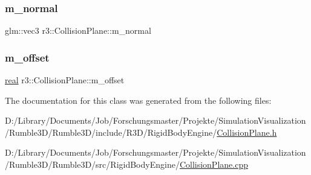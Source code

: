 \mbox{\label{classr3_1_1_collision_plane_ab65e832434d2da433e79c93ac12f4b43}} 
\subsubsection{\texorpdfstring{m\+\_\+normal}{m\_normal}}
{\footnotesize\ttfamily glm\+::vec3 r3\+::\+Collision\+Plane\+::m\+\_\+normal\hspace{0.3cm}{\ttfamily [protected]}}

\mbox{\label{classr3_1_1_collision_plane_a8ae3c28197b05088e405ff9944632f74}} 
\subsubsection{\texorpdfstring{m\+\_\+offset}{m\_offset}}
{\footnotesize\ttfamily \mbox{\hyperlink{namespacer3_ab2016b3e3f743fb735afce242f0dc1eb}{real}} r3\+::\+Collision\+Plane\+::m\+\_\+offset\hspace{0.3cm}{\ttfamily [protected]}}



The documentation for this class was generated from the following files\+:\begin{DoxyCompactItemize}
\item 
D\+:/\+Library/\+Documents/\+Job/\+Forschungsmaster/\+Projekte/\+Simulation\+Visualization/\+Rumble3\+D/\+Rumble3\+D/include/\+R3\+D/\+Rigid\+Body\+Engine/\mbox{\hyperlink{_collision_plane_8h}{Collision\+Plane.\+h}}\item 
D\+:/\+Library/\+Documents/\+Job/\+Forschungsmaster/\+Projekte/\+Simulation\+Visualization/\+Rumble3\+D/\+Rumble3\+D/src/\+Rigid\+Body\+Engine/\mbox{\hyperlink{_collision_plane_8cpp}{Collision\+Plane.\+cpp}}\end{DoxyCompactItemize}
